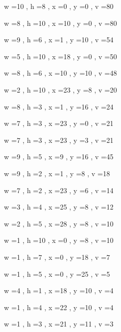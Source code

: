 \documentclass[11pt]{article}
\begin{document}
w =10 , h =8 , x =0 , y =0 , v =80
\par
w =8 , h =10 , x =10 , y =0 , v =80
\par
w =9 , h =6 , x =1 , y =10 , v =54
\par
w =5 , h =10 , x =18 , y =0 , v =50
\par
w =8 , h =6 , x =10 , y =10 , v =48
\par
w =2 , h =10 , x =23 , y =8 , v =20
\par
w =8 , h =3 , x =1 , y =16 , v =24
\par
w =7 , h =3 , x =23 , y =0 , v =21
\par
w =7 , h =3 , x =23 , y =3 , v =21
\par
w =9 , h =5 , x =9 , y =16 , v =45
\par
w =9 , h =2 , x =1 , y =8 , v =18
\par
w =7 , h =2 , x =23 , y =6 , v =14
\par
w =3 , h =4 , x =25 , y =8 , v =12
\par
w =2 , h =5 , x =28 , y =8 , v =10
\par
w =1 , h =10 , x =0 , y =8 , v =10
\par
w =1 , h =7 , x =0 , y =18 , v =7
\par
w =1 , h =5 , x =0 , y =25 , v =5
\par
w =4 , h =1 , x =18 , y =10 , v =4
\par
w =1 , h =4 , x =22 , y =10 , v =4
\par
w =1 , h =3 , x =21 , y =11 , v =3
\par
\newpage
\end{document}
